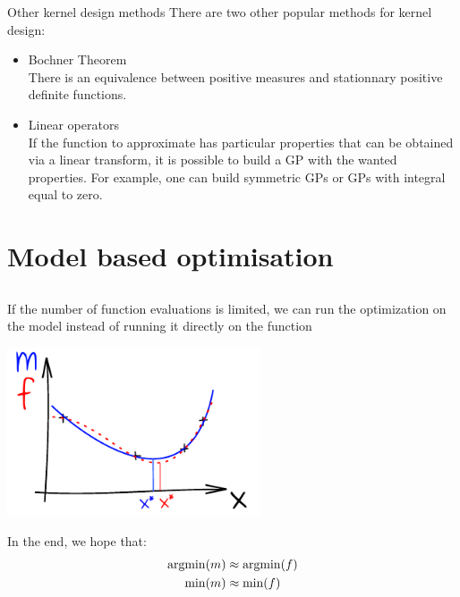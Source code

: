\documentclass{beamer}
\newcommand{\argmin}{\operatornamewithlimits{argmin}}
\begin{document}
\begin{frame}{Other kernel design methods}
There are two other popular methods for kernel design:
\begin{itemize}
    \item Bochner Theorem\\
There is an equivalence between positive measures and stationnary positive definite functions. 
    \item Linear operators\\
If the function to approximate has particular properties that can be obtained via a linear transform, it is possible to build a GP with the wanted properties. For example, one can build symmetric GPs or GPs with integral equal to zero.
\end{itemize}
\end{frame}

\section{Model based optimisation}
\subsection{}


\begin{frame}{}
If the number of function evaluations is limited, we can run the optimization on the model instead of running it directly on the function
\begin{center}
\includegraphics[height=5cm]{figures/ink_mf}
\end{center}
In the end, we hope that:
\begin{equation*}
	\begin{split}
		\argmin(m) & \approx \argmin(f)\\
		\min(m) & \approx \min(f)\\
	\end{split}
\end{equation*}
\end{frame}
\end{document}
